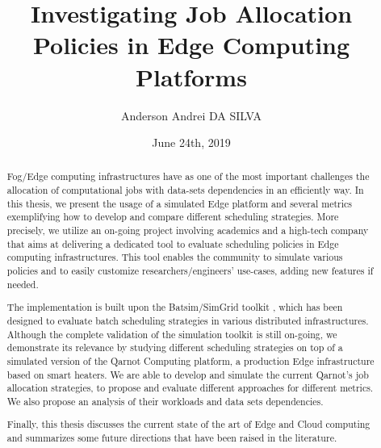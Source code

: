 \documentclass[12pt, a4paper]{memoir} %
\title{Investigating Job Allocation Policies in Edge Computing Platforms} %
\author{Anderson Andrei DA SILVA}
\date{June 24th, 2019} %
\begin{document}
\frontmatter
\begin{titlingpage}
\maketitle
\end{titlingpage}

\setlength{\parskip}{-1pt plus 1pt}

\renewcommand{\abstracttextfont}{\normalfont}
\abstractintoc
\begin{abstract}

Fog/Edge computing infrastructures have as one of the most important challenges the allocation of computational jobs with data-sets dependencies in an efficiently way.
In this thesis, we present the usage of a simulated Edge platform and several metrics exemplifying how to develop and compare different scheduling strategies.
More precisely, we utilize an on-going project involving academics and a high-tech company that aims at delivering a dedicated tool to evaluate scheduling policies in Edge computing infrastructures. 
This tool enables the community to simulate various policies and to easily customize researchers/engineers' use-cases, adding new features if needed.

The implementation is built upon the Batsim/SimGrid toolkit%
, which has been designed to evaluate batch scheduling strategies in various distributed infrastructures.
%
Although the complete validation of the simulation toolkit is still on-going, we demonstrate its relevance by studying different scheduling strategies on top of a simulated version of the Qarnot Computing platform, a production Edge infrastructure based on smart heaters. We are able to develop and simulate the current Qarnot's job allocation strategies, to propose and evaluate different approaches for different metrics.%
We also propose an analysis of their workloads and data sets dependencies.

Finally, this thesis discusses the current state of the art of Edge and Cloud computing and summarizes some future directions that have been raised in the literature.

\end{abstract}
\abstractintoc
\end{document}
